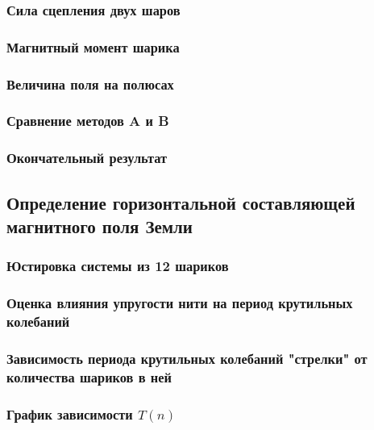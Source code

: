 \documentclass[a4paper, 12pt]{article}
\begin{document}
            \subsubsection{Сила сцепления двух шаров}

            \subsubsection{Магнитный момент шарика}

            \subsubsection{Величина поля на полюсах}

            \subsubsection{Сравнение методов A и B}

            \subsubsection{Окончательный результат}

        \subsection{Определение горизонтальной составляющей магнитного поля Земли}

            \subsubsection{Юстировка системы из 12 шариков}

            \subsubsection{Оценка влияния упругости нити на период крутильных колебаний}

            \subsubsection{Зависимость периода крутильных колебаний "стрелки" от количества шариков в ней}

            \subsubsection{График зависимости $T(n)$}
\end{document}
